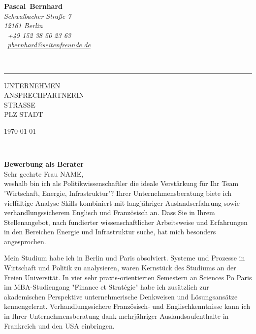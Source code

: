 \documentclass[11pt,a4paper]{article}
\def\firstname{Pascal}
\def\familyname{Bernhard}
\begin{document}
\sffamily   %
\hfill%
\begin{minipage}[t]{.6\textwidth}
	\raggedleft%
	{\bfseries {\color{firstnamecolor}\firstname}~{\color{familynamecolor}\familyname}}\\[.35ex]
	\small\itshape%
	Schwalbacher Straße 7\\
	12161 Berlin\\[.35ex]
	\Mobilefone~+49 152 38 50 23 63 \\
	\Letter~\href{mailto:pbernhard@seitenfreunde.de}{pbernhard@seitenfreunde.de}
\end{minipage}\\[0.5em]
%
{\color{firstnamecolor}\rule{\textwidth}{.25ex}}
%
\begin{minipage}[t]{.4\textwidth}
	\raggedright%
	\vspace*{1em}
	UNTERNEHMEN \\
	ANSPRECHPARTNERIN\\[.35ex]
	\small%
	STRASSE\\
	PLZ STADT
\end{minipage}
%
\hfill
%
\begin{minipage}[t]{.4\textwidth}
	\raggedleft %
	\today
\end{minipage}\\[1em]
\raggedright

{\bfseries \color{familynamecolor}Bewerbung als Berater}\\[1.5em]

Sehr geehrte Frau NAME,\\[1em]
%
weshalb bin ich als Politikwissenschaftler die ideale Verstärkung für Ihr Team 'Wirtschaft, Energie, Infrastruktur'? Ihrer Unternehmensberatung biete ich vielfältige Analyse-Skills kombiniert mit langjähriger Auslandserfahrung sowie verhandlungssicherem Englisch und Französisch an. Dass Sie in Ihrem Stellenangebot, nach fundierter wissenschaftlicher Arbeitsweise und Erfahrungen in den Bereichen Energie und Infrastruktur suche, hat mich besonders angesprochen.


Mein Studium habe ich in Berlin und Paris absolviert. Systeme und Prozesse in Wirtschaft und Politik zu analysieren, waren Kernstück des Studiums an der Freien Universität. In vier sehr praxis-orientierten Semestern an Sciences Po Paris im MBA-Studiengang "Finance et Stratégie" habe ich zusätzlich zur akademischen Perspektive unternehmerische Denkweisen und Lösungsansätze kennengelernt. Verhandlungssichere Französisch- und Englischkenntnisse kann ich in Ihrer Unternehmensberatung dank mehrjähriger Auslandsaufenthalte in Frankreich und den USA einbringen.
\end{document}
